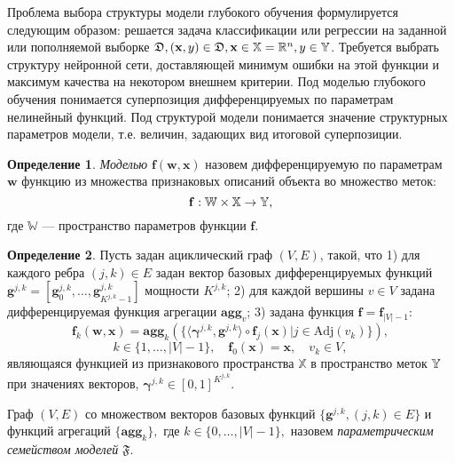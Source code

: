 \documentclass[11pt, a5paper]{dissert}
\theoremstyle{definition}
\newtheorem{defin}{Определение}
\begin{document}
Проблема выбора структуры модели глубокого обучения формулируется следующим образом: решается задача классификации или регрессии на заданной или пополняемой выборке $\mathfrak{D}, (\mathbf{x}, y) \in \mathfrak{D}, \mathbf{x} \in \mathbb{X} =  \mathbb{R}^n, y \in \mathbb{Y}$. Требуется выбрать структуру нейронной сети, доставляющей минимум ошибки на этой функции и максимум качества на некотором внешнем критерии.
 Под моделью глубокого обучения понимается суперпозиция дифференцируемых по параметрам нелинейный функций. Под структурой модели понимается значение структурных параметров модели, т.е. величин, задающих вид итоговой суперпозиции. 



\begin{defin}
\textit{Моделью} $\mathbf{f}(\mathbf{w}, \mathbf{x})$ назовем дифференцируемую по параметрам $\mathbf{w}$ функцию из множества признаковых описаний объекта во множество меток:
\[
    \mathbf{f}:  \mathbb{W}  \times \mathbb{X} \to \mathbb{Y},
\] 
где $\mathbb{W}$ --- пространство параметров функции $\mathbf{f}$.
\end{defin}

\begin{defin}
Пусть задан ациклический граф $(V,E)$, такой, что 
1) для каждого ребра $(j,k) \in E$ задан вектор базовых дифференцируемых функций  $\mathbf{g}^{j,k} = [\mathbf{g}^{j,k}_0, \dots, \mathbf{g}^{j,k}_{K^{j,k}-1}]$  мощности $K^{j,k}$;
2) для каждой вершины $v \in V$ задана дифференцируемая функция агрегации $\textbf{agg}_v$;
3) задана функция $\mathbf{f} = \mathbf{f}_{|V|-1}$:
\begin{equation}
\label{eq:modelfam}
    \mathbf{f}_{k}(\mathbf{w}, \mathbf{x}) = \textbf{agg}_{k}\left(\{ \langle \boldsymbol{\gamma}^{j,k}, \mathbf{g}^{j,k} \rangle \circ  \mathbf{f}_j(\mathbf{x})| j \in \text{Adj}(v_k)\}\right), 
\end{equation}
\[
k \in \{1,\dots,|V|-1\}, \quad \mathbf{f}_0(\mathbf{x}) = \mathbf{x}, \quad v_k \in V,
\]
являющаяся функцией из признакового пространства $\mathbb{X}$ в пространство меток $\mathbb{Y}$ при значениях векторов, $\boldsymbol{\gamma}^{j,k} \in [0,1]^{K^{j,k}}$.

Граф $(V, E)$ со множеством векторов базовых функций $\{\mathbf{g}^{j,k}, (j,k) \in E\}$ и функций агрегаций $\{\textbf{agg}_k\},$ где $k \in \{0, \dots, |V|-1\},$ назовем \textit{параметрическим семейством моделей} $\mathfrak{F}$.
\end{defin}
\end{document}
